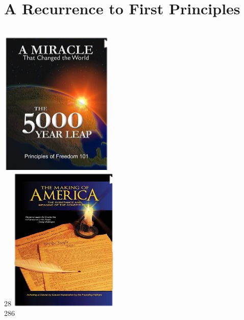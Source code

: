 \section{A Recurrence to First Principles}

\frame{\sectionpage}

\begin{frame}
    \begin{columns}[onlytextwidth]
            \centering
            \includegraphics{img/5000-year-leap.png}
            \\ 28
            \pause
            \centering
            \includegraphics{img/making-of-america.png}
            \\ 286
    \end{columns}
\end{frame}

